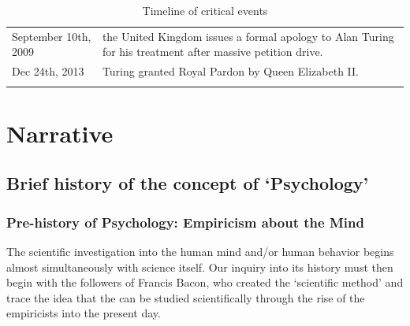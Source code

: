 \begin{longtable}[!t]{ | P{2cm} | P{11.8cm} | }
September 10th, 2009&the United Kingdom issues a formal apology to Alan Turing for his treatment after massive petition drive. \\
Dec 24th, 2013&Turing granted Royal Pardon by Queen Elizabeth II. \\ \hline

\caption{Timeline of critical events}
\label{table: timeline}
\end{longtable}


\section{Narrative}
\label{narrative}

\subsection{Brief history of the concept of `Psychology'}
\label{briefhistoryoftheconceptofpsychology}

\subsubsection{Pre-history of Psychology: Empiricism about the Mind}
\label{pre-historyofpsychology:empiricismaboutthemind}

The scientific investigation into the human mind and\slash or human behavior begins almost simultaneously with science itself. Our inquiry into its history must then begin with the followers of Francis Bacon, who created the `scientific method' and trace the idea that the can be studied scientifically through the rise of the empiricists into the present day.

